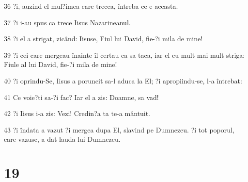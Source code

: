 \par 36 ?i, auzind el mul?imea care trecea, întreba ce e aceasta.
\par 37 ?i i-au spus ca trece Iisus Nazarineanul.
\par 38 ?i el a strigat, zicând: Iisuse, Fiul lui David, fie-?i mila de mine!
\par 39 ?i cei care mergeau înainte îl certau ca sa taca, iar el cu mult mai mult striga: Fiule al lui David, fie-?i mila de mine!
\par 40 ?i oprindu-Se, Iisus a poruncit sa-l aduca la El; ?i apropiindu-se, l-a întrebat:
\par 41 Ce voie?ti sa-?i fac? Iar el a zis: Doamne, sa vad!
\par 42 ?i Iisus i-a zis: Vezi! Credin?a ta te-a mântuit.
\par 43 ?i îndata a vazut ?i mergea dupa El, slavind pe Dumnezeu. ?i tot poporul, care vazuse, a dat lauda lui Dumnezeu.

\chapter{19}


